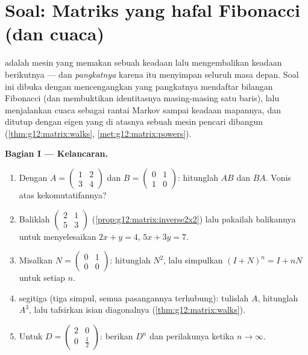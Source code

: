 \section{Soal: Matriks yang hafal Fibonacci (dan
cuaca)}

\begin{problem}
\label{pb:g12:matrix:1}
 adalah mesin yang memakan sebuah keadaan lalu mengembalikan keadaan
berikutnya --- dan \emph{pangkatnya} karena itu menyimpan seluruh masa depan. Soal
ini dibuka dengan  mencengangkan yang pangkatnya mendaftar
bilangan Fibonacci (dan membuktikan identitasnya masing-masing satu baris),
lalu menjalankan cuaca sebagai rantai Markov sampai keadaan mapannya, dan
ditutup dengan  eigen yang di atasnya sebuah mesin pencari dibangun
(\cref{thm:g12:matrix:walks},
\cref{met:g12:matrix:powers}).

\medskip
\noindent\textbf{Bagian I --- Kelancaran.}
\begin{enumerate}
  \item Dengan $A = \begin{pmatrix} 1 & 2\\ 3 & 4\end{pmatrix}$
        dan $B = \begin{pmatrix} 0 & 1\\ 1 & 0\end{pmatrix}$:
        hitunglah $AB$ dan $BA$. Vonis atas kekomutatifannya?
  \item Baliklah $\begin{pmatrix} 2 & 1\\ 5 & 3\end{pmatrix}$
        (\cref{prop:g12:matrix:inverse2x2}) lalu pakailah balikannya
        untuk menyelesaikan $2x + y = 4$, $5x + 3y = 7$.
  \item Misalkan $N = \begin{pmatrix} 0 & 1\\ 0 & 0\end{pmatrix}$:
        hitunglah $N^2$, lalu simpulkan
        $(I + N)^n = I + nN$ untuk setiap $n$.
  \item {} segitiga (tiga simpul, semua pasangannya terhubung):
        tulislah  $A$, hitunglah $A^3$, lalu
        tafsirkan isian diagonalnya
        (\cref{thm:g12:matrix:walks}).
  \item Untuk $D = \begin{pmatrix} 2 & 0\\ 0 & \frac12
        \end{pmatrix}$: berikan $D^n$ dan perilakunya ketika
        $n \to \infty$.
\end{enumerate}


\end{problem}
